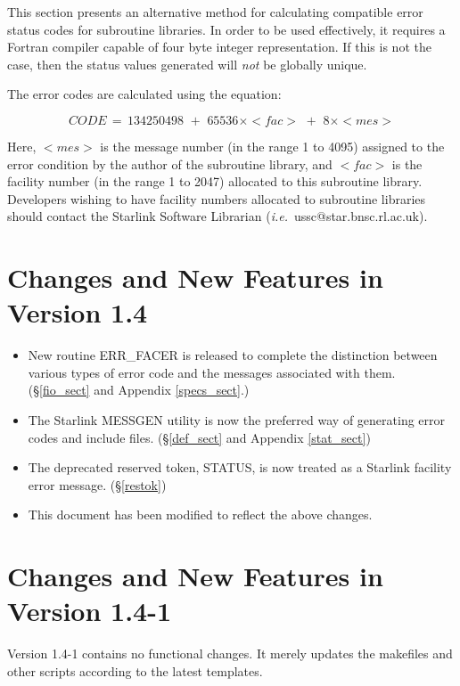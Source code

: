 \documentclass[twoside,11pt]{starlink}
\begin{document}
This section presents an alternative method for calculating compatible
error status codes for subroutine libraries.
In order to be used effectively, it requires a Fortran compiler capable of four
byte integer representation.
If this is not the case, then the status values generated will \emph{not} be
globally unique.

The error codes are calculated using the equation:

\begin {equation}
CODE \,= \, 134250498 \,\, + \,\, 65536\times <fac> \,\, + \,\,  8\times <mes>
\end {equation}

Here, $<mes>$ is the message number (in the range 1 to 4095) assigned to the
error condition by the author of the subroutine library, and $<fac>$ is the
facility number (in the range 1 to 2047) allocated to this subroutine library.
Developers wishing to have facility numbers allocated to subroutine libraries
should contact the Starlink Software Librarian
(\textit{i.e.}\ ussc@star.bnsc.rl.ac.uk).

\section{Changes and New Features in Version 1.4}
\begin{itemize}
\item New routine ERR\_FACER is released to complete the distinction between
various types of error code and the messages associated with them.
(\S\ref{fio_sect} and Appendix \ref{specs_sect}.)
\item The Starlink MESSGEN utility is now the preferred way of generating
error codes and include files. (\S\ref{def_sect} and Appendix \ref{stat_sect})
\item The deprecated reserved token, STATUS, is now treated as a Starlink
facility error message. (\S\ref{restok})
\item This document has been modified to reflect the above changes.
\end{itemize}

\section{Changes and New Features in Version 1.4-1}
Version 1.4-1 contains no functional changes. It merely updates the makefiles
and other scripts according to the latest templates.
\end{document}
